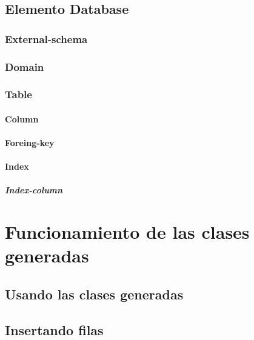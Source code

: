 \documentclass[12pt, oneside]{article}
\begin{document}
	\subsection{Elemento Database}
		

		\subsubsection{External-schema}
			

		\subsubsection{Domain}
			

		\subsubsection{Table}
			

			\paragraph{Column}
				

			\paragraph{Foreing-key}
				

			\paragraph{Index}
				

				\subparagraph{Index-column}
					

\section{Funcionamiento de las clases generadas}
	\subsection{Usando las clases generadas}
		

	\subsection{Insertando filas}
		
\end{document}
